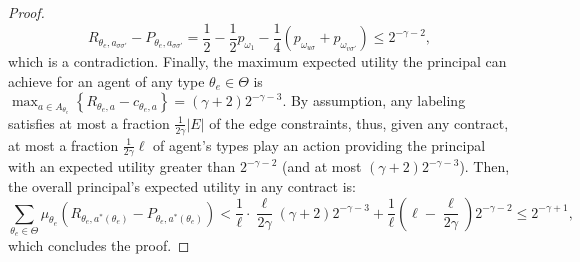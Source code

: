\begin{proof}
\[		R_{\theta_e, a_{ \sigma \sigma'}  } - P_{\theta_e , a_{ \sigma \sigma'}  } = \frac{1}{2} - \frac{1}{2}p_{\omega_1} - \frac{1}{4} \left( p_{\omega_{u \sigma}}+p_{\omega_{v \sigma'}} \right) \leq 2^{-\gamma-2},
	\]
	which is a contradiction.
	Finally, the maximum expected utility the principal can achieve for an agent of any type $\theta_e \in \Theta$ is $\max_{a \in A_{\theta_e}} \left\{ R_{\theta_e, a} - c_{\theta_e, a} \right\} = (\gamma+2)2^{-\gamma-3}$.
	By assumption, any labeling satisfies at most a fraction $\frac{1}{2\gamma} |E|$ of the edge constraints, thus, given any contract, at most a fraction $\frac{1}{2\gamma} \ell$ of agent's types play an action providing the principal with an expected utility greater than $2^{-\gamma-2}$ (and at most $(\gamma+2)2^{-\gamma-3}$).
	Then, the overall principal's expected utility in any contract is:
	\[
		\sum_{\theta_{e} \in \Theta} \mu_{\theta_{e}} \left( R_{\theta_{e}, a^*(\theta_{e})} - P_{\theta_{e}, a^*(\theta_{e})} \right) < \frac{1}{\ell} \cdot \frac{\ell}{2 \gamma} (\gamma+2)2^{-\gamma-3}+ \frac{1}{\ell} \left( \ell - \frac{\ell}{2 \gamma} \right)2^{-\gamma-2} \leq 2^{-\gamma+1},
	\]
	which concludes the proof.
\end{proof}



